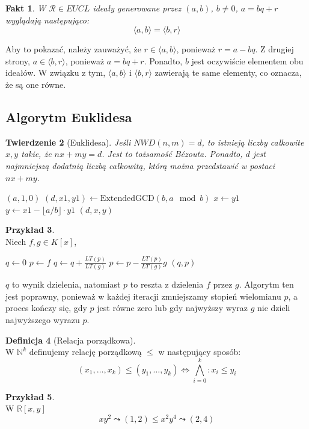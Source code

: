 \documentclass[11pt,a4paper]{article}
\newcommand{\curly}{\mathrel{\leadsto}}
\newtheorem{twierdzenie}{Twierdzenie}[section]
\newtheorem{fakt}[twierdzenie]{Fakt}
\theoremstyle{definition}
\newtheorem{definicja}[twierdzenie]{Definicja}
\newtheorem{przyklad}[twierdzenie]{Przykład}
\theoremstyle{remark}
\begin{document}
\begin{fakt}
    W $\mathcal{R} \in EUCL$ ideały generowane przez $(a,b)$, $b \neq 0$, $a = bq + r$ wyglądają następująco:
    \[
        \langle a, b \rangle = \langle b, r \rangle
    \]
\end{fakt}
Aby to pokazać, należy zauważyć, że $ r \in \langle a, b \rangle$, ponieważ $r = a - bq$. Z drugiej strony, $a \in \langle b, r \rangle$, ponieważ $a = bq + r$. Ponadto, $b$ jest oczywiście elementem obu ideałów. W związku z tym, $\langle a, b \rangle$ i $\langle b, r \rangle$ zawierają te same elementy, co oznacza, że są one równe.
\subsection{Algorytm Euklidesa}
\begin{twierdzenie}[Euklidesa]
    Jeśli $NWD(n,m) = d$, to istnieją liczby całkowite $x, y$ takie, że $nx + my = d$. Jest to tożsamość Bézouta. Ponadto, $d$ jest najmniejszą dodatnią liczbą całkowitą, którą można przedstawić w postaci $nx + my$.
\end{twierdzenie}
\begin{algorithm}
\caption{Algorytm Euklidesa}
\begin{algorithmic}[1]
    \State \Return $(a, 1, 0)$
\Else
    \State $(d, x1, y1) \gets \text{ExtendedGCD}(b, a \mod b)$
    \State $x \gets y1$
    \State $y \gets x1 - \lfloor a / b \rfloor \cdot y1$
    \State \Return $(d, x, y)$
\EndIf
\EndProcedure
\end{algorithmic}
\end{algorithm}

\begin{przyklad}~\\
    Niech $f,g \in K[x]$,
    \begin{algorithmic}[1]
    \State $q \gets 0$
    \State $p \gets f$
        \State $q \gets q + \frac{LT(p)}{LT(g)}$
        \State $p \gets p - \frac{LT(p)}{LT(g)}g$
    \EndWhile
    \State \Return $(q, p)$
    \EndProcedure
    \end{algorithmic}
    $q$ to wynik dzielenia, natomiast $p$ to reszta z dzielenia $f$ przez $g$. Algorytm ten jest poprawny, ponieważ w każdej iteracji zmniejszamy stopień wielomianu $p$, a proces kończy się, gdy $p$ jest równe zero lub gdy najwyższy wyraz $g$ nie dzieli najwyższego wyrazu $p$.
\end{przyklad}
\begin{definicja}[Relacja porządkowa]~\\
    W $\mathbb{N}^k$ definujemy relację porządkową $\leq$ w następujący sposób:
    \[
        (x_1, \dots, x_k) \leq (y_1, \dots, y_k) \iff \bigwedge_{i=0}^k: x_i \leq y_i
    \]
\end{definicja}
\begin{przyklad}~\\
    W $\mathbb{R}[x, y]$ 
    \[
        xy^2 \curly (1, 2) \leq x^2y^4 \curly (2, 4)
    \]
\end{przyklad}
\end{document}

